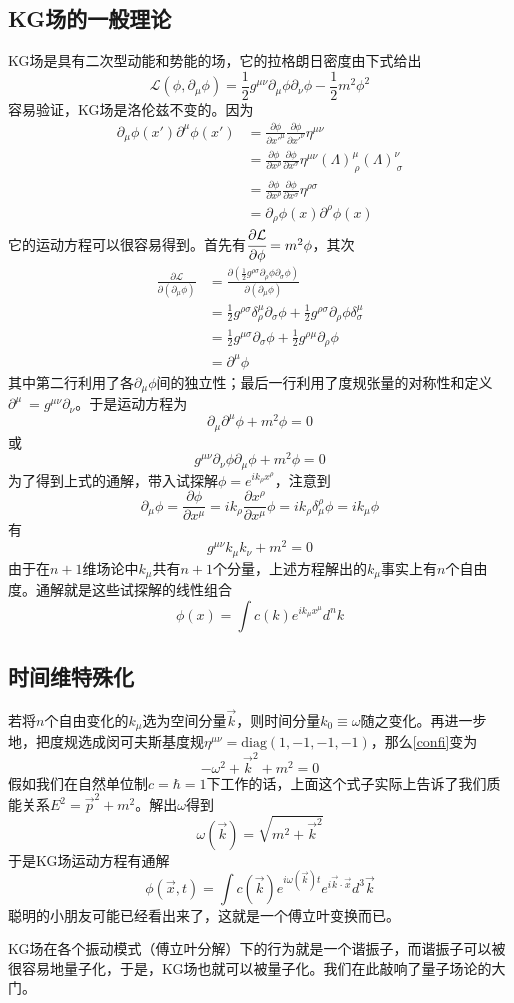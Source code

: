 \documentclass[a4paper,11pt]{ctexart}
\newcommand{\beq}{\begin{equation}}
\newcommand{\eeq}{\end{equation}}
\newcommand{\bea}{\begin{equation}\begin{aligned}}
\newcommand{\eea}{\end{aligned}\end{equation}}
\newcommand{\lag}{\mathcal{L}}
\newcommand{\diag}{\mathrm{diag}}
\begin{document}
\subsection{KG场的一般理论}
KG场是具有二次型动能和势能的场，它的拉格朗日密度由下式给出
\beq
\lag(\phi,\partial_\mu \phi) = \frac{1}{2} g^{\mu \nu} \partial_\mu \phi \partial_\nu \phi  - \frac{1}{2}m^2 \phi^2
\eeq
容易验证，KG场是洛伦兹不变的。因为
\bea
\partial_\mu \phi(x') \partial^\mu \phi(x') &= \frac{\partial \phi}{\partial x'^\mu} \frac{\partial \phi}{\partial x'^\nu} \eta^{\mu \nu} \\
&= \frac{\partial \phi}{\partial x^\rho} \frac{\partial \phi}{\partial x^\sigma} \eta^{\mu \nu} (\Lambda)^\mu_{\ \rho} (\Lambda)^\nu_{\ \sigma} \\
&= \frac{\partial \phi}{\partial x^\rho} \frac{\partial \phi}{\partial x^\sigma} \eta^{\rho \sigma} \\
&= \partial_\rho \phi(x) \partial^\rho \phi(x)
\eea
它的运动方程可以很容易得到。首先有$\cfrac{\partial \lag}{\partial \phi} = m^2 \phi$，其次
\bea
\frac{\partial \lag}{\partial (\partial_\mu \phi)} &= \frac{\partial (\frac{1}{2} g^{\rho \sigma} \partial_\rho \phi \partial_\sigma \phi)}{\partial (\partial_\mu \phi)} \\
&= \frac{1}{2} g^{\rho \sigma} \delta^\mu_\rho \partial_\sigma \phi + \frac{1}{2} g^{\rho \sigma} \partial_\rho \phi \delta^\mu_\sigma \\
&= \frac{1}{2} g^{\mu \sigma} \partial_\sigma \phi + \frac{1}{2} g^{\rho \mu} \partial_\rho \phi \\
&= \partial^\mu \phi
\eea
其中第二行利用了各$\partial_\mu \phi$间的独立性；最后一行利用了度规张量的对称性和定义$\partial^\mu \ = g^{\mu \nu} \partial_\nu$。于是运动方程为
\beq
\partial_\mu \partial^\mu \phi + m^2 \phi = 0
\eeq
或
\beq
g^{\mu \nu} \partial_\nu \phi \partial_\mu \phi + m^2 \phi = 0
\eeq
为了得到上式的通解，带入试探解$\phi=  e^{i k_\rho x^\rho}$，注意到
\beq
\partial_\mu \phi = \frac{\partial \phi}{\partial x^\mu}
= i k_\rho \frac{\partial x^\rho}{\partial x^\mu} \phi
= i k_\rho \delta^\rho_\mu \phi = ik_\mu \phi
\eeq
有
\beq \label{confi}
g^{\mu \nu} k_\mu k_\nu + m^2 = 0
\eeq
由于在$n+1$维场论中$k_\mu$共有$n+1$个分量，上述方程解出的$k_\mu$事实上有$n$个自由度。通解就是这些试探解的线性组合
\beq
\phi(x) = \int c(k) e^{i k_\mu x^\mu} d^{n}k
\eeq
\subsection{时间维特殊化}
若将$n$个自由变化的$k_\mu$选为空间分量$\vec{k}$，则时间分量$k_0 \equiv \omega$随之变化。再进一步地，把度规选成闵可夫斯基度规$\eta^{\mu \nu} = \diag (1,-1,-1,-1)$，那么\cref{confi}变为
\beq
-\omega^2 + \vec{k}^2 + m^2 = 0
\eeq
假如我们在自然单位制$c = \hbar = 1$下工作的话，上面这个式子实际上告诉了我们质能关系$E^2 = \vec{p}^2 + m^2$。解出$\omega$得到
\beq
\omega(\vec{k}) = \sqrt{m^2 + \vec{k}^2}
\eeq
于是KG场运动方程有通解
\beq
\phi(\vec{x},t) = \int c(\vec{k}) e^{i \omega(\vec{k}) t} e^{i \vec{k} \cdot \vec{x}} d^3 \vec{k}
\eeq
聪明的小朋友可能已经看出来了，这就是一个傅立叶变换而已。
\par
KG场在各个振动模式（傅立叶分解）下的行为就是一个谐振子，而谐振子可以被很容易地量子化，于是，KG场也就可以被量子化。我们在此敲响了量子场论的大门。
\end{document}
